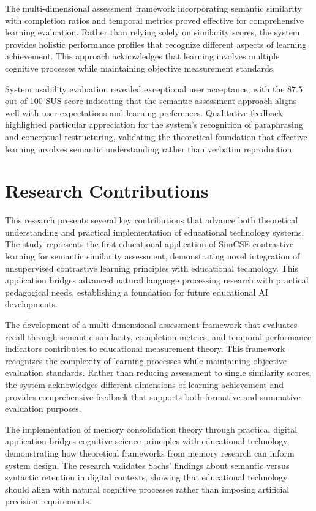 {The multi-dimensional assessment framework incorporating semantic similarity with completion ratios and temporal metrics proved effective for comprehensive learning evaluation. Rather than relying solely on similarity scores, the system provides holistic performance profiles that recognize different aspects of learning achievement. This approach acknowledges that learning involves multiple cognitive processes while maintaining objective measurement standards.

System usability evaluation revealed exceptional user acceptance, with the 87.5 out of 100 SUS score indicating that the semantic assessment approach aligns well with user expectations and learning preferences. Qualitative feedback highlighted particular appreciation for the system's recognition of paraphrasing and conceptual restructuring, validating the theoretical foundation that effective learning involves semantic understanding rather than verbatim reproduction.

\section{Research Contributions}

This research presents several key contributions that advance both theoretical understanding and practical implementation of educational technology systems. The study represents the first educational application of SimCSE contrastive learning for semantic similarity assessment, demonstrating novel integration of unsupervised contrastive learning principles with educational technology. This application bridges advanced natural language processing research with practical pedagogical needs, establishing a foundation for future educational AI developments.

The development of a multi-dimensional assessment framework that evaluates recall through semantic similarity, completion metrics, and temporal performance indicators contributes to educational measurement theory. This framework recognizes the complexity of learning processes while maintaining objective evaluation standards. Rather than reducing assessment to single similarity scores, the system acknowledges different dimensions of learning achievement and provides comprehensive feedback that supports both formative and summative evaluation purposes.

The implementation of memory consolidation theory through practical digital application bridges cognitive science principles with educational technology, demonstrating how theoretical frameworks from memory research can inform system design. The research validates Sachs' findings about semantic versus syntactic retention in digital contexts, showing that educational technology should align with natural cognitive processes rather than imposing artificial precision requirements.

}
